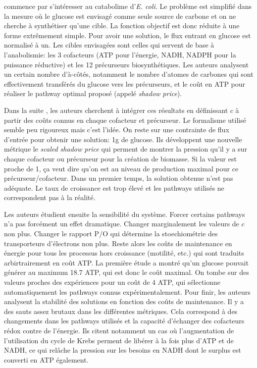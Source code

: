\citet{varma_metabolic_1993} commence par s'intéresser au catabolime d'\textit{E. coli}. Le problème est simplifié dans la mesure où le glucose est envisagé comme seule source de carbone et on ne cherche à synthétiser qu'une cible. La fonction objectif est donc réduite à une forme extrêmement simple. Pour avoir une solution, le flux entrant en glucose est normalisé à un. Les cibles envisagées sont celles qui servent de base à l'anabolismie: les 3 cofacteurs (ATP pour l'énergie, NADH, NADPH pour la puissance réductive) et les 12 précurseurs biosynthétiques. Les auteurs analysent un certain nombre d'à-côtés, notamment le nombre d'atomes de carbones qui sont effectivement transférés du glucose vers les précurseurs, et le coût en ATP pour réaliser le pathway optimal proposé (appelé \textit{shadow price}).

Dans la suite \citep{varma_metabolic_1993-1}, les auteurs cherchent à intégrer ces résultats en définissant $c$ à partir des coûts connus en chaque cofacteur et précurseur. Le formalisme utilisé semble peu rigoureux mais c'est l'idée. On reste sur une contrainte de flux d'entrée pour obtenir une solution: 1g de glucose. Ils développent une nouvelle métrique le \textit{scaled shadow price} qui perment de montrer la pression qu'il y a sur chaque cofacteur ou précurseur pour la création de biomasse. Si la valeur est proche de 1, ça veut dire qu'on est au niveau de production maximal pour ce précurseur/cofacteur. Dans un premier temps, la solution obtenue n'est pas adéquate. Le taux de croissance est trop élevé et les pathways utilisés ne correspondent pas à la réalité.

Les auteurs étudient ensuite la sensibilité du système. Forcer certains pathways n'a pas forcément un effet dramatique. Changer marginalement les valeurs de $c$ non plus. Changer le rapport P/O qui détermine la stoechiométrie des transporteurs d'électrons non plus. Reste alors les coûts de maintenance en énergie pour tous les processus hors croissance (motilité, etc.) qui sont traduits arbirtrairement en coût ATP. La première étude a montré qu'un glucose pouvait générer au maximum 18.7 ATP, qui est donc le coût maximal. On tombe sur des valeurs proches des expériences pour un coût de 4 ATP, qui sélectionne automatiquement les pathways connus expérimentalement. Pour finir, les auteurs analysent la stabilité des solutions en fonction des coûts de maintenance. Il y a des sauts assez brutaux dans les différentes métriques. Cela correspond à des changements dans les pathways utilisés et la capacité d'échanger des cofacteurs rédox contre de l'énergie. Ils citent notamment un cas où l'augmentation de l'utilisation du cycle de Krebs perment de libérer à la fois plus d'ATP et de NADH, ce qui relâche la pression sur les besoins en NADH dont le surplus est converti en ATP également.

